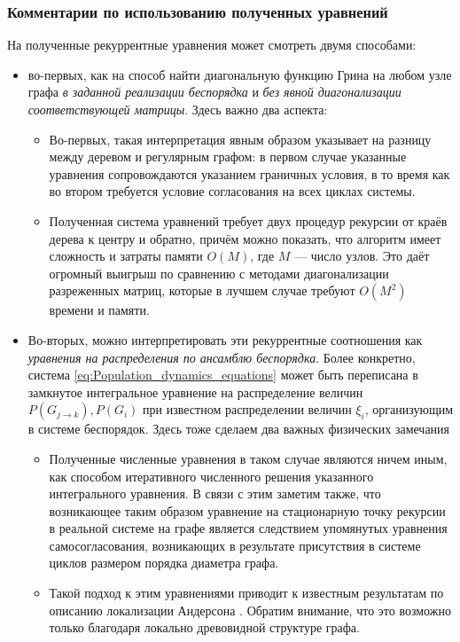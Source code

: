 \subsubsection{Комментарии по использованию полученных уравнений}
На полученные рекуррентные уравнения может смотреть двумя способами:
\begin{itemize}
	\item во-первых, как на способ найти диагональную функцию Грина на любом узле графа \textit{в заданной реализации беспорядка} и \textit{без явной диагонализации соответствующей матрицы}. Здесь важно два аспекта:
	\begin{itemize}
		\item Во-первых, такая интерпретация явным образом указывает на разницу между деревом и регулярным графом: в первом случае указанные уравнения сопровождаются указанием граничных условия, в то время как во втором требуется условие согласования на всех циклах системы.
		\item Полученная система уравнений требует двух процедур рекурсии от краёв дерева к центру и обратно, причём можно показать, что алгоритм имеет сложность и затраты памяти $O(M)$, где $M$ --- число узлов. Это даёт огромный выигрыш по сравнению с методами диагонализации разреженных матриц, которые в лучшем случае требуют $O(M^2)$ времени и памяти. 
	\end{itemize}
	\item Во-вторых, можно интерпретировать эти рекуррентные соотношения как \textit{уравнения на распределения по ансамблю беспорядка}. Более конкретно, система \eqref{eq:Population_dynamics_equations} может быть переписана в замкнутое интегральное уравнение на распределение величин $P(G_{j \rightarrow k}), P(G_i)$ при известном распределении величин $\xi_i$, организующим в системе беспорядок. Здесь тоже сделаем два важных физических замечания
	\begin{itemize}
		\item Полученные численные уравнения в таком случае являются ничем иным, как способом итеративного численного решения указанного интегрального уравнения. В связи с этим заметим также, что возникающее таким образом уравнение на стационарную точку рекурсии в реальной системе на графе является следствием упомянутых уравнения самосогласования, возникающих в результате присутствия в системе циклов размером порядка диаметра графа. 
		\item Такой подход к этим уравнениями приводит к известным результатам по описанию локализации Андерсона \cite{AAT}. Обратим внимание, что это возможно только благодаря локально древовидной структуре графа. 
	\end{itemize}
\end{itemize}

